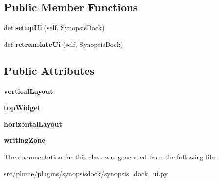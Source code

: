 \subsection*{Public Member Functions}
\begin{DoxyCompactItemize}
\item 
def {\bfseries setup\+Ui} (self, Synopsis\+Dock)\hypertarget{classplume-creator_1_1src_1_1plume_1_1plugins_1_1synopsisdock_1_1synopsis__dock__ui_1_1_ui___synopsis_dock_a2806da1f30b42356d11933953c2ea165}{}\label{classplume-creator_1_1src_1_1plume_1_1plugins_1_1synopsisdock_1_1synopsis__dock__ui_1_1_ui___synopsis_dock_a2806da1f30b42356d11933953c2ea165}

\item 
def {\bfseries retranslate\+Ui} (self, Synopsis\+Dock)\hypertarget{classplume-creator_1_1src_1_1plume_1_1plugins_1_1synopsisdock_1_1synopsis__dock__ui_1_1_ui___synopsis_dock_a0598ce68d0804e90766b637e73579ad6}{}\label{classplume-creator_1_1src_1_1plume_1_1plugins_1_1synopsisdock_1_1synopsis__dock__ui_1_1_ui___synopsis_dock_a0598ce68d0804e90766b637e73579ad6}

\end{DoxyCompactItemize}
\subsection*{Public Attributes}
\begin{DoxyCompactItemize}
\item 
{\bfseries vertical\+Layout}\hypertarget{classplume-creator_1_1src_1_1plume_1_1plugins_1_1synopsisdock_1_1synopsis__dock__ui_1_1_ui___synopsis_dock_ac713b2a329003808fcc79c3981f9cc3e}{}\label{classplume-creator_1_1src_1_1plume_1_1plugins_1_1synopsisdock_1_1synopsis__dock__ui_1_1_ui___synopsis_dock_ac713b2a329003808fcc79c3981f9cc3e}

\item 
{\bfseries top\+Widget}\hypertarget{classplume-creator_1_1src_1_1plume_1_1plugins_1_1synopsisdock_1_1synopsis__dock__ui_1_1_ui___synopsis_dock_a1db2e1c2279f549b2e801e7d4633a7d5}{}\label{classplume-creator_1_1src_1_1plume_1_1plugins_1_1synopsisdock_1_1synopsis__dock__ui_1_1_ui___synopsis_dock_a1db2e1c2279f549b2e801e7d4633a7d5}

\item 
{\bfseries horizontal\+Layout}\hypertarget{classplume-creator_1_1src_1_1plume_1_1plugins_1_1synopsisdock_1_1synopsis__dock__ui_1_1_ui___synopsis_dock_ae3f5ce46a423e2613c98f3bd3dbe18bc}{}\label{classplume-creator_1_1src_1_1plume_1_1plugins_1_1synopsisdock_1_1synopsis__dock__ui_1_1_ui___synopsis_dock_ae3f5ce46a423e2613c98f3bd3dbe18bc}

\item 
{\bfseries writing\+Zone}\hypertarget{classplume-creator_1_1src_1_1plume_1_1plugins_1_1synopsisdock_1_1synopsis__dock__ui_1_1_ui___synopsis_dock_ace0cebfa97f47739e5d2d6427ea7802b}{}\label{classplume-creator_1_1src_1_1plume_1_1plugins_1_1synopsisdock_1_1synopsis__dock__ui_1_1_ui___synopsis_dock_ace0cebfa97f47739e5d2d6427ea7802b}

\end{DoxyCompactItemize}


The documentation for this class was generated from the following file\+:\begin{DoxyCompactItemize}
\item 
src/plume/plugins/synopsisdock/synopsis\+\_\+dock\+\_\+ui.\+py\end{DoxyCompactItemize}

